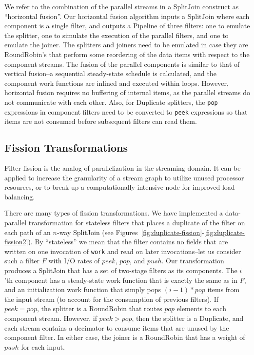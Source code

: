We refer to the combination of the parallel streams in a SplitJoin
construct as ``horizontal fusion''.  Our horizontal fusion algorithm
inputs a SplitJoin where each component is a single filter, and
outputs a Pipeline of three filters: one to emulate the splitter, one
to simulate the execution of the parallel filters, and one to emulate
the joiner.  The splitters and joiners need to be emulated in case
they are RoundRobin's that perform some reordering of the data items
with respect to the component streams.  The fusion of the parallel
components is similar to that of vertical fusion--a sequential
steady-state schedule is calculated, and the component work functions
are inlined and executed within loops.  However, horizontal fusion
requires no buffering of internal items, as the parallel streams do
not communicate with each other.  Also, for Duplicate splitters, the
{\tt pop} expressions in component filters need to be converted to
{\tt peek} expressions so that items are not consumed before
subsequent filters can read them.

\subsection{Fission Transformations}

Filter fission is the analog of parallelization in the streaming
domain.  It can be applied to increase the granularity of a stream
graph to utilize unused processor resources, or to break up a
computationally intensive node for improved load balancing.  

There are many types of fission transformations.  We have implemented
a data-parallel transformation for stateless filters that places a
duplicate of the filter on each path of an $n$-way SplitJoin (see
Figures~\ref{fig:duplicate-fission}-\ref{fig:duplicate-fission2}).  By
``stateless'' we mean that the filter contains no fields that are
written on one invocation of {\tt work} and read on later
invocations--let us consider such a filter $F$ with I/O rates of
$peek$, $pop$, and $push$.  Our transformation produces a SplitJoin
that has a set of two-stage filters as its components.  The $i$'th
component has a steady-state work function that is exactly the same as
in $F$, and an initialization work function that simply pops
$(i-1)*pop$ items from the input stream (to account for the
consumption of previous filters).  If $peek=pop$, the splitter is a
RoundRobin that routes $pop$ elements to each component stream.
However, if $peek>pop$, then the splitter is a Duplicate, and each
stream contains a decimator to consume items that are unused by the
component filter.  In either case, the joiner is a RoundRobin that has
a weight of $push$ for each input.

